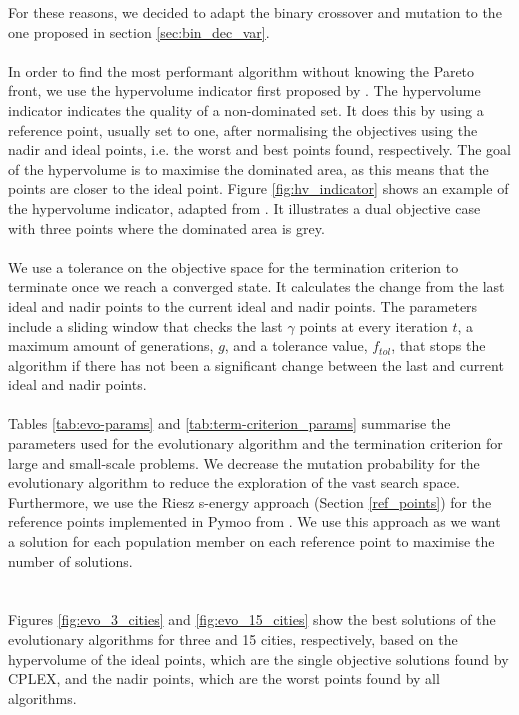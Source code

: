 \documentclass[mscthesis, 11pt]{usiinfthesis}
\theoremstyle{newdefinition}
\begin{document}
For these reasons, we decided to adapt the binary crossover and mutation to the one proposed in section \ref{sec:bin_dec_var}. 
\\\\
In order to find the most performant algorithm without knowing the Pareto front, we use the hypervolume indicator first proposed by \cite{hutchison_indicator-based_2004}. The hypervolume indicator indicates the quality of a non-dominated set. It does this by using a reference point, usually set to one, after normalising the objectives using the nadir and ideal points, i.e. the worst and best points found, respectively. The goal of the hypervolume is to maximise the dominated area, as this means that the points are closer to the ideal point. Figure \ref{fig:hv_indicator} shows an example of the hypervolume indicator, adapted from \cite{fonseca_improved_2006}. It illustrates a dual objective case with three points where the dominated area is grey.
\\\\
We use a tolerance on the objective space for the termination criterion to terminate once we reach a converged state. It calculates the change from the last ideal and nadir points to the current ideal and nadir points. The parameters include a sliding window that checks the last $\gamma$ points at every iteration $t$, a maximum amount of generations, $g$, and a tolerance value, $f_{tol}$, that stops the algorithm if there has not been a significant change between the last and current ideal and nadir points.\\\\
Tables \ref{tab:evo-params} and \ref{tab:term-criterion_params} summarise the parameters used for the evolutionary algorithm and the termination criterion for large and small-scale problems. We decrease the mutation probability for the evolutionary algorithm to reduce the exploration of the vast search space. Furthermore, we use the Riesz s-energy approach (Section \ref{ref_points}) for the reference points implemented in Pymoo from \cite{blank_generating_2021}. We use this approach as we want a solution for each population member on each reference point to maximise the number of solutions.
\\\\\\
Figures \ref{fig:evo_3_cities} and \ref{fig:evo_15_cities} show the best solutions of the evolutionary algorithms for three and 15 cities, respectively, based on the hypervolume of the ideal points, which are the single objective solutions found by CPLEX, and the nadir points, which are the worst points found by all algorithms. 
\end{document}
